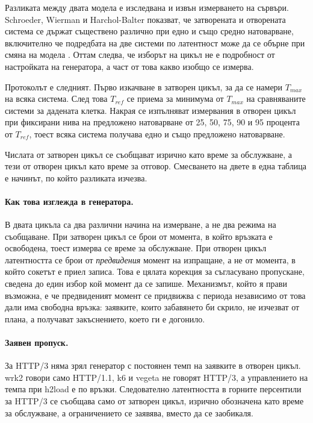 Разликата между двата модела е изследвана и извън измерването на сървъри. Schroeder, Wierman
и Harchol-Balter показват, че затворената и отворената система се държат съществено различно
при едно и също средно натоварване, включително че подредбата на две системи по латентност
може да се обърне при смяна на модела \cite{schroeder2006open}. Оттам следва, че изборът на
цикъл не е подробност от настройката на генератора, а част от това какво изобщо се измерва.



Протоколът е следният. Първо изкачване в затворен цикъл, за да се намери $T_{max}$ на всяка
система. След това $T_{ref}$ се приема за минимума от $T_{max}$ на сравняваните системи за
дадената клетка. Накрая се изпълняват измервания в отворен цикъл при фиксирани нива на
предложено натоварване от 25, 50, 75, 90 и 95 процента от $T_{ref}$, тоест всяка система
получава едно и също предложено натоварване.

Числата от затворен цикъл се съобщават изрично като време за обслужване, а тези от отворен
цикъл като време за отговор. Смесването на двете в една таблица е начинът, по който
разликата изчезва.

\paragraph{Как това изглежда в генератора.} В  двата цикъла са два различни
начина на измерване, а не два режима на съобщаване. При затворен цикъл се брои от момента, в
който връзката е освободена, тоест измерва се време за обслужване. При отворен цикъл
латентността се брои от \emph{предвидения} момент на изпращане, а не от момента, в който
сокетът е приел записа. Това е цялата корекция за съгласувано пропускане, сведена до един избор
кой момент да се запише. Механизмът, който я прави възможна, е че предвиденият момент се
придвижва с периода независимо от това дали има свободна връзка: заявките, които забавянето би
скрило, не изчезват от плана, а получават закъснението, което ги е догонило.

\paragraph{Заявен пропуск.} За HTTP/3 няма зрял генератор с постоянен темп на заявките в
отворен цикъл. wrk2 говори само HTTP/1.1, k6 и vegeta не говорят HTTP/3, а управлението на
темпа при h2load е по връзки. Следователно латентността в горните персентили за HTTP/3 се
съобщава само от затворен цикъл, изрично обозначена като време за обслужване, а
ограничението се заявява, вместо да се заобикаля.

